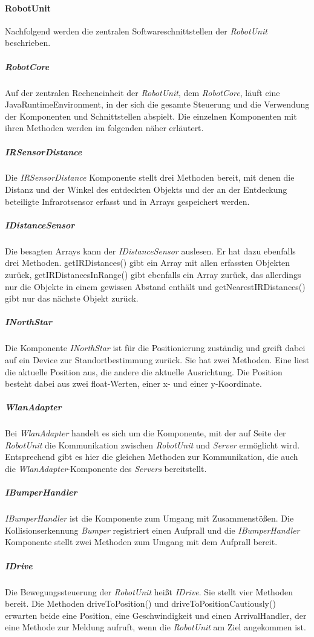     \paragraph{RobotUnit}\label{robotunit}
    		Nachfolgend werden die zentralen Softwareschnittstellen der \emph{RobotUnit} beschrieben.
    	\subparagraph{RobotCore}\label{robotcore}
    		Auf der zentralen Recheneinheit der \emph{RobotUnit}, dem \emph{RobotCore}, läuft eine JavaRuntimeEnvironment, in der sich die gesamte Steuerung und die Verwendung der Komponenten und Schnittstellen abspielt.
    		Die einzelnen Komponenten mit ihren Methoden werden im folgenden näher erläutert.
    	\subparagraph{IRSensorDistance}\label{irsensordistance}
    		Die \emph{IRSensorDistance} Komponente stellt drei Methoden bereit, mit denen die Distanz und der Winkel des entdeckten Objekts und der an der Entdeckung beteiligte Infrarotsensor erfasst und in Arrays gespeichert werden.
    	\subparagraph{IDistanceSensor}\label{idistancesensor}
    		Die besagten Arrays kann der \emph{IDistanceSensor} auslesen.
    		Er hat dazu ebenfalls drei Methoden. getIRDistances() gibt ein Array mit allen erfassten Objekten zurück, getIRDistancesInRange() gibt ebenfalls ein Array zurück, das allerdings nur die Objekte in einem gewissen Abstand enthält und getNearestIRDistances() gibt nur das nächste Objekt zurück.
    	\subparagraph{INorthStar}\label{inorthstar}
    		Die Komponente \emph{INorthStar} ist für die Positionierung zuständig und greift dabei auf ein Device zur Standortbestimmung zurück.
    		Sie hat zwei Methoden.
    		Eine liest die aktuelle Position aus, die andere die aktuelle Ausrichtung.
    		Die Position besteht dabei aus zwei float-Werten, einer x- und einer y-Koordinate.
    	\subparagraph{WlanAdapter}\label{wlanadapter}
    		Bei \emph{WlanAdapter} handelt es sich um die Komponente, mit der auf Seite der \emph{RobotUnit} die Kommunikation zwischen \emph{RobotUnit} und \emph{Server} ermöglicht wird.
    		Entsprechend gibt es hier die gleichen Methoden zur Kommunikation, die auch die \emph{WlanAdapter}-Komponente des \emph{Servers} bereitstellt.
    	\subparagraph{IBumperHandler}\label{ibumperhandler}
    		\emph{IBumperHandler} ist die Komponente zum Umgang mit Zusammenstößen.
    		Die Kollisionserkennung \emph{Bumper} registriert einen Aufprall und die \emph{IBumperHandler} Komponente stellt zwei Methoden zum Umgang mit dem Aufprall bereit.
    	\subparagraph{IDrive}\label{idrive}
    		Die Bewegungssteuerung der \emph{RobotUnit} heißt \emph{IDrive}.
    		Sie stellt vier Methoden bereit.
    		Die Methoden driveToPosition() und driveToPositionCautiously() erwarten beide eine Position, eine Geschwindigkeit und einen ArrivalHandler, der eine Methode zur Meldung aufruft, wenn die \emph{RobotUnit} am Ziel angekommen ist.
